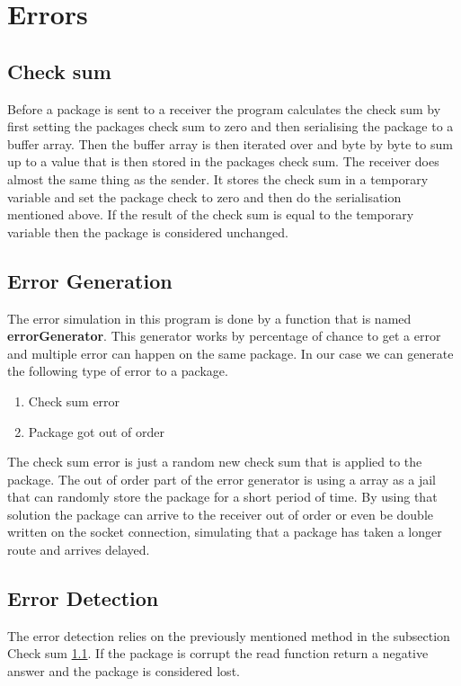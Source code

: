 \section{Errors}\label{subsec:errors}
\subsection{Check sum}\label{subsec:csum}
Before a package is sent to a receiver the program calculates the check sum by  first setting the packages check sum to zero and then serialising the package to a buffer array. Then the buffer array is then iterated over and byte by byte to sum up to a value that is then stored in the packages check sum. The receiver does almost the same thing as the sender. It stores the check sum in a temporary variable and set the package check to zero and then do the serialisation mentioned above. If the result of the check sum is equal to the temporary variable then the package is considered unchanged.
\subsection{Error Generation}\label{subsec:errGen}
The error simulation in this program is done by a function that is named \textbf{errorGenerator}. This generator works by percentage of chance to get a error and multiple error can happen on the same package. In our case we can generate the following type of error to a package. 
\begin{enumerate}
    \item Check sum error
    \item Package got out of order
\end{enumerate}
The check sum error is just a random new check sum that is applied to the package. The out of order part of the error generator is using a array as a jail that can randomly store the package for a short period of time. By using that solution the package can arrive to the receiver out of order or even be double written on the socket connection, simulating that a package has taken a longer route and arrives delayed. 

\subsection{Error Detection}\label{subsec:errDet}
The error detection relies on the previously mentioned method in the subsection Check sum \ref{subsec:csum}. If the package is corrupt the read function return a negative answer and the package is considered lost.


